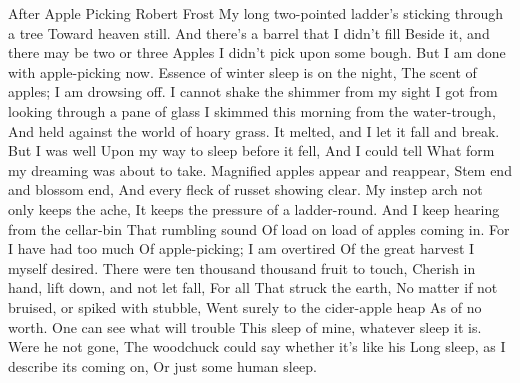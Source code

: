 \begin{poem}
{After Apple Picking}
{Robert Frost}
     My long two-pointed ladder's sticking through a tree 
     Toward heaven still. 				  
     And there's a barrel that I didn't fill 		  
     Beside it, and there may be two or three 		  
     Apples I didn't pick upon some bough. 		  
     But I am done with apple-picking now. 		  
     Essence of winter sleep is on the night, 		  
     The scent of apples; I am drowsing off. 		  
     I cannot shake the shimmer from my sight 		  
     I got from looking through a pane of glass 	  
     I skimmed this morning from the water-trough, 	  
     And held against the world of hoary grass. 	  
     It melted, and I let it fall and break. 		  
     But I was well 					  
     Upon my way to sleep before it fell, 		  
     And I could tell 					  
     What form my dreaming was about to take. 		  
     Magnified apples appear and reappear, 		  
     Stem end and blossom end, 				  
     And every fleck of russet showing clear. 		  
     My instep arch not only keeps the ache, 		  
     It keeps the pressure of a ladder-round. 		  
     And I keep hearing from the cellar-bin 		  
     That rumbling sound 				  
     Of load on load of apples coming in. 		  
     For I have had too much 				  
     Of apple-picking; I am overtired 			  
     Of the great harvest I myself desired. 		  
     There were ten thousand thousand fruit to touch, 	  
     Cherish in hand, lift down, and not let fall, 	  
     For all 						  
     That struck the earth, 				  
     No matter if not bruised, or spiked with stubble, 	  
     Went surely to the cider-apple heap 		  
     As of no worth. 					  
     One can see what will trouble 			  
     This sleep of mine, whatever sleep it is. 		  
     Were he not gone, 					  
     The woodchuck could say whether it's like his 	  
     Long sleep, as I describe its coming on, 		  
     Or just some human sleep.                            
\end{poem}

